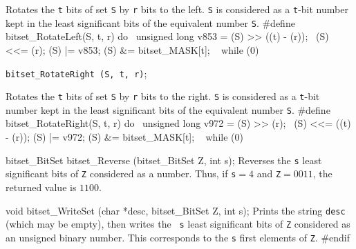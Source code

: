  \tab  Rotates the {\tt t} bits of set {\tt S} by {\tt r} bits to the left.
  {\tt S} is considered as a {\tt t}-bit number kept
  in the least significant bits of the equivalent number {\tt S}.
 \endtab
\code
\hide
#define bitset_RotateLeft(S, t, r) do { \
   unsigned long v853 = (S) >> ((t) - (r)); \
   (S) <<= (r);   (S) |= v853;   (S) &= bitset_MASK[t]; \
   } while (0)
\endhide
\endcode

\noindent 
{\tt bitset\_RotateRight (S, t, r)};

 \tab  Rotates the {\tt t} bits of set {\tt S} by {\tt r} bits to the right.
  {\tt S} is considered as a {\tt t}-bit number kept
  in the least significant bits of the equivalent number {\tt S}.
 \endtab
\code
\hide
#define bitset_RotateRight(S, t, r) do { \
   unsigned long v972 = (S) >> (r); \
   (S) <<= ((t) - (r));   (S) |= v972;   (S) &= bitset_MASK[t]; \
   } while (0)
\endhide
\endcode




\code

bitset_BitSet bitset_Reverse (bitset_BitSet Z, int s);
\endcode
\tab Reverses the {\tt s} least significant bits of {\tt Z} considered as a 
number. Thus, if {\tt s}${}=4$ and {\tt Z}${}=0011$, the returned value is $1100$.
 \endtab
\code


void bitset_WriteSet (char *desc, bitset_BitSet Z, int s);
\endcode
  \tab 
  Prints the string {\tt desc} (which may be empty), then writes the {\tt
  s} least significant bits of {\tt Z} considered as an unsigned binary number.
  This corresponds to the {\tt s} first elements of {\tt Z}.
 \endtab
\code
\hide
#endif
\endhide
\endcode
